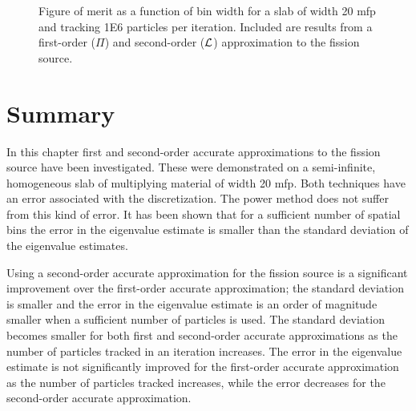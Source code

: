 \begin{comment}
         90 & 0.22 & 3.8174 & 3.4\e{-4} & 7.8\e{-5} & 1730.6 \\
        105 & 0.19 & 3.8179 & 3.4\e{-4} & 1.1\e{-4} & 1701.9 \\
        120 & 0.17 & 3.8172 & 3.7\e{-4} & 4.8\e{-5} & 1985.2 \\
        135 & 0.15 & 3.8178 & 4.2\e{-4} & 1.9\e{-4} & 1757.3 \\
        150 & 0.13 & 3.8165 & 5.8\e{-4} & 6.2\e{-5} & 2015.0 \\        
        \bottomrule
    \end{tabular}
    \caption{Second higher order eigenvalue bias for second-order ($\Lin$) spatial discretization with 1 million particles tracked.  }
    \label{tab:Bias2Linear1E6}
\end{table}
\end{comment}

\begin{sidewaysfigure} \centering
    
    \caption{Figure of merit as a function of bin width for a slab of width 20 mfp and tracking 1E6 particles per iteration.  Included are results from a first-order ($\Pi$) and second-order ($\mathcal{L}$) approximation to the fission source.}
    \label{fig:BiasFOM1E6}
\end{sidewaysfigure}

\section{Summary} \label{sec:SpatialDiscretizationSummary}
In this chapter first and second-order accurate approximations to the fission source have been investigated.  These were demonstrated on a semi-infinite, homogeneous slab of multiplying material of width 20 mfp.  Both techniques have an error associated with the discretization.  The power method does not suffer from this kind of error.  It has been shown that for a sufficient number of spatial bins the error in the eigenvalue estimate is smaller than the standard deviation of the eigenvalue estimates.  

Using a second-order accurate approximation for the fission source is a significant improvement over the first-order accurate approximation; the standard deviation is smaller and the error in the eigenvalue estimate is an order of magnitude smaller when a sufficient number of particles is used.  The standard deviation becomes smaller for both first and second-order accurate approximations as the number of particles tracked in an iteration increases.  The error in the eigenvalue estimate is not significantly improved for the first-order accurate approximation as the number of particles tracked increases, while the error decreases for the second-order accurate approximation.

